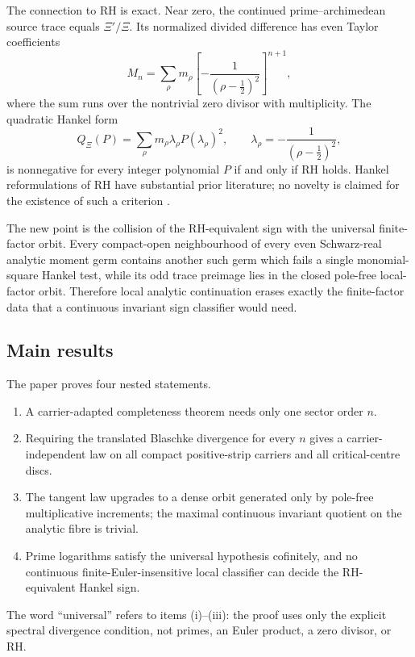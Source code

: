 \documentclass[11pt]{article}
\begin{document}
The connection to RH is exact.  Near zero, the continued prime--archimedean source
trace equals \(\Xi'/\Xi\).  Its normalized divided difference has even Taylor
coefficients
\[
 M_n=\sum_{\rho}m_\rho
 \left[-\frac{1}{(\rho-\frac12)^2}\right]^{n+1},
 \tag{1.6}
\]
where the sum runs over the nontrivial zero divisor with multiplicity.  The quadratic
Hankel form
\[
 Q_\Xi(P)=\sum_\rho m_\rho\lambda_\rho P(\lambda_\rho)^2,
 \qquad
 \lambda_\rho=-\frac{1}{(\rho-\frac12)^2},
 \tag{1.7}
\]
is nonnegative for every integer polynomial \(P\) if and only if RH holds.  Hankel
reformulations of RH have substantial prior literature; no novelty is claimed for
the existence of such a criterion
\cite{Matiyasevich2007,Matiyasevich2017,BickelPascoeSargent2023}.

The new point is the collision of the RH-equivalent sign with the universal
finite-factor orbit.  Every compact-open neighbourhood of every even Schwarz-real
analytic moment germ contains another such germ which fails a single monomial-square
Hankel test, while its odd trace preimage lies in the closed pole-free local-factor
orbit.  Therefore local analytic continuation erases exactly the finite-factor data
that a continuous invariant sign classifier would need.

\subsection{Main results}

The paper proves four nested statements.

\begin{enumerate}[label=\textup{(\roman*)}]
\item A carrier-adapted completeness theorem needs only one sector order \(n\).
\item Requiring the translated Blaschke divergence for every \(n\) gives a
carrier-independent law on all compact positive-strip carriers and all
critical-centre discs.
\item The tangent law upgrades to a dense orbit generated only by pole-free
multiplicative increments; the maximal continuous invariant quotient on the
analytic fibre is trivial.
\item Prime logarithms satisfy the universal hypothesis cofinitely, and no
continuous finite-Euler-insensitive local classifier can decide the
RH-equivalent Hankel sign.
\end{enumerate}

The word ``universal'' refers to items (i)--(iii): the proof uses only the explicit
spectral divergence condition, not primes, an Euler product, a zero divisor, or RH.
\end{document}
